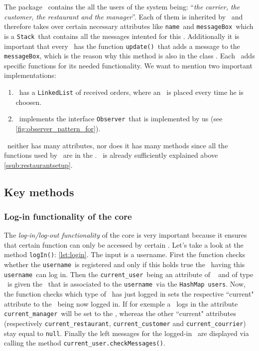 The package \users~contains the all the users of the system being: ``\textit{the carrier, the customer, the restaurant and the manager}''.
Each of them is inherited by \User~and therefore takes over certain necessary attributes like \lstinline|name|~and \lstinline|messageBox|~which is a \lstinline|Stack|~that contains all the messages intented for this \User. Additionally it is important that every \User~has the function \lstinline|update()|~that adds a message to the \lstinline|messageBox|, which is the reason why this method is also in the class \User. Each \User~adds specific functions for its needed functionality. We want to mention two important implementations:

\begin{enumerate}
	\item \Courier~has a \lstinline|LinkedList| of received orders, where an \Order~is placed every time he is choosen.
	\item \Customer~implements the interface \lstinline|Observer|~that is implemented by us (see  \ref{fig:observer_pattern_for}).
\end{enumerate}

\Manager~neither has many attributes, nor does it has many methods since all the functions used by \Manager~are in the \Core.
\Restaurant~is already sufficiently explained above \ref{ssub:restaurantsetup}.


\subsection{Key methods} %
\label{sub:key_methods}


\subsubsection{Log-in functionality of the core} %
\label{ssub:log_in_functionality_of_the_core}

The \emph{log-in/log-out functionality} of the core is very important because it ensures that certain function can only be accessed by certain \User. Let's take a look at the method \lstinline|logIn()|: \ref{lst:login}. The input is a username. First the function checks whether the \lstinline|username|~is registered and only if this holds true the \User~having this \lstinline|username|~can log in. Then the \lstinline|current_user|~being an attribute of \Core~ and of type \User~is given the \User~that is associated to the \lstinline|username|~via the \lstinline|HashMap|~\lstinline|users|. Now, the function checks which type of \User~has just logged in sets the respective ``current" attribute to the \User~being now logged in. If for exemple a \Manager~logs in the attribute \lstinline|current_manager|~will be set to the \User, whereas the other ``current" attributes (respectively \lstinline|current_restaurant|, \lstinline|current_customer| and \lstinline|current_courrier|) stay equal to \lstinline|null|. Finally the left messages for the logged-in \User~are displayed via calling the method \lstinline|current_user.checkMessages()|.

